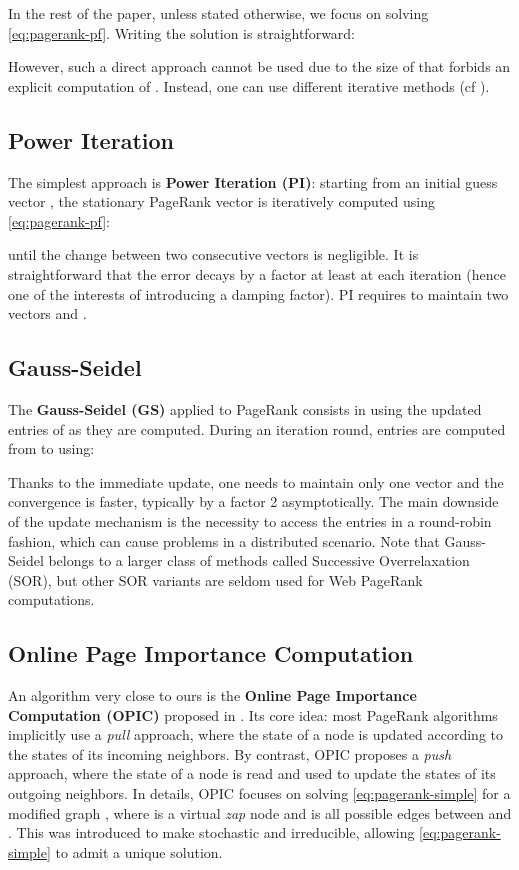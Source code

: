 \documentclass{llncs}
\begin{document}
\label{sec:pagerank}

In the rest of the paper, unless stated otherwise, we focus on solving \eqref{eq:pagerank-pf}. Writing the solution is straightforward:


However, such a direct approach cannot be used due to the size of  that forbids an explicit computation of . Instead, one can use different iterative methods (cf \cite{LM04}). 

\subsection{Power Iteration}

The simplest approach is \textbf{Power Iteration (PI)}: starting from an initial guess vector , the stationary PageRank vector is iteratively computed using \eqref{eq:pagerank-pf}:

until the change between two consecutive vectors is negligible. It is straightforward that the error decays by a factor at least  at each iteration (hence one of the interests of introducing a damping factor). PI requires to maintain two vectors  and .



\subsection{Gauss-Seidel}

The \textbf{Gauss-Seidel (GS)} applied to PageRank consists in using the updated entries of  as they are computed. During an iteration round, entries  are computed from  to  using:


Thanks to the immediate update, one needs to maintain only one vector and the convergence is faster, typically by a factor 2 asymptotically. The main downside of the update mechanism is the necessity to access the entries in a round-robin fashion, which can cause problems in a distributed scenario.
Note that Gauss-Seidel belongs to a larger class of methods called Successive Overrelaxation (SOR), but other SOR variants are seldom used for Web PageRank computations\cite{SOR}.




\subsection{Online Page Importance Computation}
\label{sec:opic}

An algorithm very close to ours is the \textbf{Online Page Importance Computation (OPIC)} proposed in \cite{AP03}. Its core idea: most PageRank algorithms implicitly use a \emph{pull} approach, where the state of a node is updated according to the states of its incoming neighbors. By contrast, OPIC proposes a \emph{push} approach, where the state of a node is read and used to update the states of its outgoing neighbors. In details, OPIC focuses on solving \eqref{eq:pagerank-simple} for a modified graph , where  is a virtual \emph{zap} node and  is all possible edges between  and . This was introduced to make  stochastic and irreducible, allowing \eqref{eq:pagerank-simple} to admit a unique solution.
\end{document}
